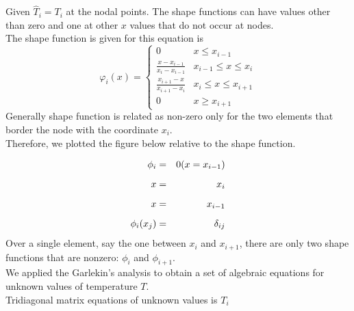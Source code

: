 \documentclass[12pt]{report}
\newcommand{\sps}{\\[0.2cm]}
\newcommand{\NI}{\noindent}
\newcommand{\dsp}{\displaystyle}
\begin{document}
	\NI Given $\hat{T}_i = T_i$ at the nodal points. The shape functions can have values other than zero and one at other $x$ values that do not occur at nodes.\sps
	The shape function is given for this equation is
	\begin{equation}
		\varphi_i(x) = 
		\left\{
			\begin{array}{ll}
				0 & x \leq x_{i-1}\sps
				\dsp \frac{x-x_{i-1}}{x_i - x_{i-1}} & x_{i-1} \leq x \leq x_i\sps
				\dsp \frac{x_{i+1}-x}{x_{i+1} - x_i} & x_i \leq x \leq x_{i+1}\sps
				0 & x \geq x_{i+1}
			\end{array}
		\right. \label{eq:4_25}
	\end{equation}
	Generally shape function is related as non-zero only for the two elements that border the node with the coordinate $x_i$.\sps
	
	\NI Therefore, we plotted the figure below relative to the shape function.\sps
	\begin{center}
	\end{center}
	\begin{eqnarray}
		\phi_i &=& 0 (x=x_{i-1})\notag\sps
		x &=& x_i \notag\sps
		x &=& x_{i-1} \notag\sps
		\phi_i(x_j) &=& \delta_{ij}\notag
	\end{eqnarray}
	Over a single element, say the one between $x_i$ and $x_{i+1}$, there are only two shape functions that are nonzero: $\phi_i$ and $\phi_{i+1}$.\\
	
	\NI We applied the Garlekin’s analysis to obtain a set of algebraic equations for unknown values of temperature $T$.\sps
	
	\NI Tridiagonal matrix equations of unknown values is $T_i$\sps
	
\end{document}
